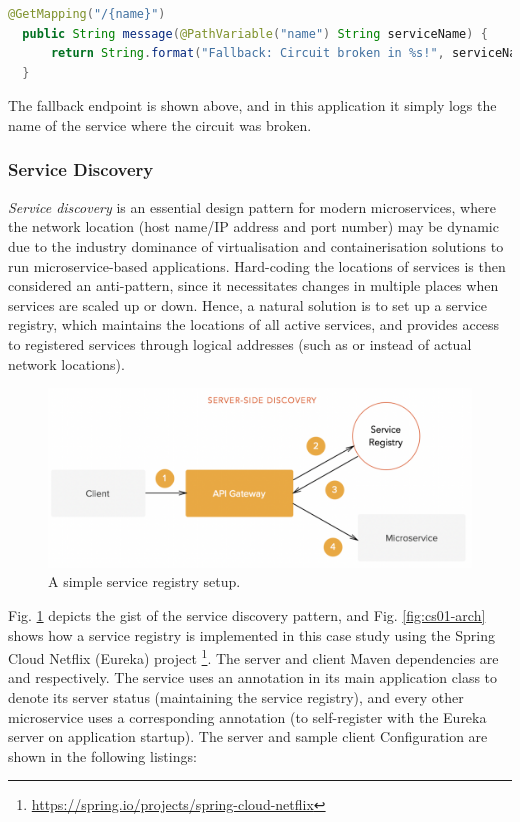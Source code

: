 \begin{lstlisting}[language=Java, caption=Code snippet from \code{FallbackController.java}]
  @GetMapping("/{name}")
  public String message(@PathVariable("name") String serviceName) {
      return String.format("Fallback: Circuit broken in %s!", serviceName);
  }
\end{lstlisting}

The fallback endpoint is shown above, and in this application it simply logs the name of the service where the circuit was broken.

\subsubsection{Service Discovery}

\textit{Service discovery} is an essential design pattern for modern microservices, where the network location (host name/IP address and port number) may be dynamic due to the industry dominance of virtualisation and containerisation solutions to run microservice-based applications. Hard-coding the locations of services is then considered an anti-pattern, since it necessitates changes in multiple places when services are scaled up or down. Hence, a natural solution is to set up a service registry, which maintains the locations of all active services, and provides access to registered services through logical addresses (such as  or  instead of actual network locations).

\begin{figure}[H]
  \centering
  \includegraphics[width=0.7\linewidth]{./assets/images/case-studies/server-side-discovery.png}
  \caption{A simple service registry setup.}
  \label{fig:server-side-discovery}
\end{figure}

Fig. \ref{fig:server-side-discovery} depicts the gist of the service discovery pattern, and Fig. \ref{fig:cs01-arch} shows how a service registry is implemented in this case study using the Spring Cloud Netflix (Eureka) project \footnote{\url{https://spring.io/projects/spring-cloud-netflix}}. The server and client Maven dependencies are  and  respectively. The  service uses an  annotation in its main application class to denote its server status (maintaining the service registry), and every other microservice uses a corresponding  annotation (to self-register with the Eureka server on application startup). The server and sample client Configuration are shown in the following listings:

